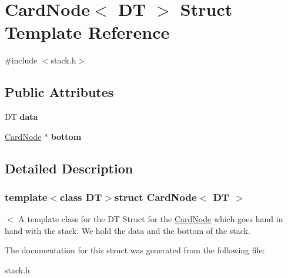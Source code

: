 \hypertarget{struct_card_node}{\section{Card\-Node$<$ D\-T $>$ Struct Template Reference}
\label{struct_card_node}
}


{\ttfamily \#include $<$stack.\-h$>$}

\subsection*{Public Attributes}
\begin{DoxyCompactItemize}
\item 
\hypertarget{struct_card_node_aaf85d42d125cb3fa84f88683bfbe07bb}{D\-T {\bfseries data}}\label{struct_card_node_aaf85d42d125cb3fa84f88683bfbe07bb}

\item 
\hypertarget{struct_card_node_a213b1d7a1f956945c05c7f4ae1c239c7}{\hyperlink{struct_card_node}{Card\-Node} $\ast$ {\bfseries bottom}}\label{struct_card_node_a213b1d7a1f956945c05c7f4ae1c239c7}

\end{DoxyCompactItemize}


\subsection{Detailed Description}
\subsubsection*{template$<$class D\-T$>$struct Card\-Node$<$ D\-T $>$}

$<$ A template class for the D\-T Struct for the \hyperlink{struct_card_node}{Card\-Node} which goes hand in hand with the stack. We hold the data and the bottom of the stack. 

The documentation for this struct was generated from the following file\-:\begin{DoxyCompactItemize}
\item 
stack.\-h\end{DoxyCompactItemize}
